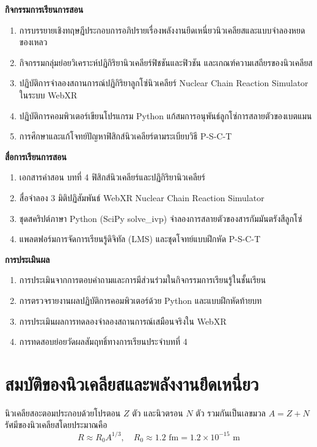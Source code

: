 \begin{lessonplanbox}
\noindent\textbf{กิจกรรมการเรียนการสอน}
\begin{enumerate}
    \item การบรรยายเชิงทฤษฎีประกอบการอภิปรายเรื่องพลังงานยึดเหนี่ยวนิวเคลียสและแบบจำลองหยดของเหลว
    \item กิจกรรมกลุ่มย่อยวิเคราะห์ปฏิกิริยานิวเคลียร์ฟิชชันและฟิวชัน และเกณฑ์ความเสถียรของนิวเคลียส
    \item ปฏิบัติการจำลองสถานการณ์ปฏิกิริยาลูกโซ่นิวเคลียร์ Nuclear Chain Reaction Simulator ในระบบ WebXR
    \item ปฏิบัติการคอมพิวเตอร์เขียนโปรแกรม Python แก้สมการอนุพันธ์ลูกโซ่การสลายตัวของเบตแมน
    \item การศึกษาและแก้โจทย์ปัญหาฟิสิกส์นิวเคลียร์ตามระเบียบวิธี P-S-C-T
\end{enumerate}

\noindent\textbf{สื่อการเรียนการสอน}
\begin{enumerate}
    \item เอกสารคำสอน บทที่ 4 ฟิสิกส์นิวเคลียร์และปฏิกิริยานิวเคลียร์
    \item สื่อจำลอง 3 มิติปฏิสัมพันธ์ WebXR Nuclear Chain Reaction Simulator
    \item ชุดสคริปต์ภาษา Python (SciPy solve\_ivp) จำลองการสลายตัวของสารกัมมันตรังสีลูกโซ่
    \item แพลตฟอร์มการจัดการเรียนรู้ดิจิทัล (LMS) และชุดโจทย์แบบฝึกหัด P-S-C-T
\end{enumerate}

\noindent\textbf{การประเมินผล}
\begin{enumerate}
    \item การประเมินจากการตอบคำถามและการมีส่วนร่วมในกิจกรรมการเรียนรู้ในชั้นเรียน
    \item การตรวจรายงานผลปฏิบัติการคอมพิวเตอร์ด้วย Python และแบบฝึกหัดท้ายบท
    \item การประเมินผลการทดลองจำลองสถานการณ์เสมือนจริงใน WebXR
    \item การทดสอบย่อยวัดผลสัมฤทธิ์ทางการเรียนประจำบทที่ 4
\end{enumerate}
\end{lessonplanbox}
\newpage

\section{สมบัติของนิวเคลียสและพลังงานยึดเหนี่ยว}

นิวเคลียสอะตอมประกอบด้วยโปรตอน $Z$ ตัว และนิวตรอน $N$ ตัว รวมกันเป็นเลขมวล $A = Z + N$ รัศมีของนิวเคลียสโดยประมาณคือ
\begin{equation}
R \approx R_0 A^{1/3}, \quad R_0 \approx 1.2\text{ fm} = 1.2 \times 10^{-15}\text{ m}
\end{equation}

